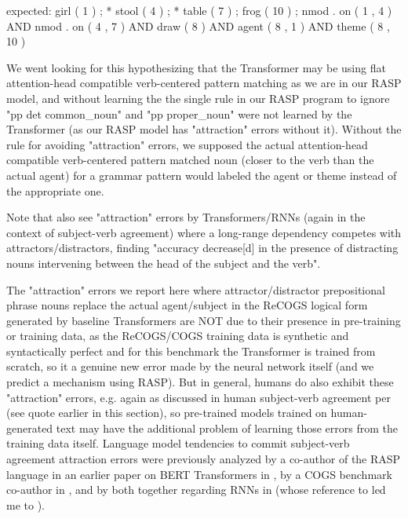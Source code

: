 \documentclass[11pt]{article}
\begin{document}
expected: girl ( 1 ) ; * stool ( 4 ) ; * table ( 7 ) ; frog ( 10 ) ; nmod . on ( 1 , 4 ) AND nmod . on ( 4 , 7 ) AND draw ( 8 ) AND agent ( 8 , 1 ) AND theme ( 8 , 10 )

We went looking for this hypothesizing that the \citep{Wu2023} Transformer may be using flat attention-head compatible verb-centered pattern matching as we are in our RASP model,
and without learning the the single rule in our RASP program to ignore "pp det common\_noun" and "pp proper\_noun" were not learned by the Transformer (as our RASP model has "attraction" errors without it). Without the rule for avoiding "attraction" errors, we supposed the actual attention-head compatible verb-centered pattern matched noun (closer to the verb than the actual agent) for a grammar pattern would labeled the agent or theme instead of the appropriate one.

Note that \citep{vanschijndel2019quantitydoesntbuyquality} also see "attraction" errors by Transformers/RNNs (again in the context of subject-verb agreement) where a long-range dependency competes with attractors/distractors, finding "accuracy decrease[d] in the presence of distracting nouns intervening between the head of the subject and the verb".

The "attraction" errors we report here where attractor/distractor prepositional phrase nouns replace the actual agent/subject in the ReCOGS logical form generated by \citep{Wu2023} baseline Transformers are NOT due to their presence in pre-training or training data, as the ReCOGS/COGS training data is synthetic and syntactically perfect and for this benchmark the Transformer is trained from scratch, so it a genuine new error made by the neural network itself (and we predict a mechanism using RASP). But in general, humans do also exhibit these "attraction" errors, e.g. again as discussed in human subject-verb agreement per \citep{jespersen1913modernenglishgrammar1954reprint} (see quote earlier in this section), so pre-trained models trained on human-generated text may have the additional problem of learning those errors from the training data itself. Language model tendencies to commit subject-verb agreement attraction errors were previously analyzed by a co-author of the RASP language in an earlier paper on BERT Transformers in \citep{goldberg2019assessingbertssyntacticabilities}, by a COGS benchmark co-author in \citep{vanschijndel2019quantitydoesntbuyquality}, and by both together regarding RNNs in \citep{linzen2016assessing} (whose reference to \citep{agreementwithnearestlanguagelog} led me to \citep{jespersen1913modernenglishgrammar1954reprint}).
\end{document}
